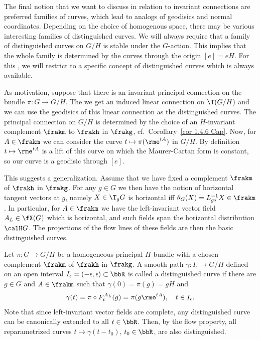The final notion that we want to discuss in relation to invariant connections are preferred families of curves, which lead to analogs of geodisics and normal coordinates. Depending on the choice of homogenous space, there may be various interesting families of distinguished curves. We will always require that a family of distinguished curves on $G\slash H$ is stable under the $G$-action. This implies that the whole family is determined by the curves through the origin $[e]=eH$. For this \subsect, we will restrict to a specific concept of distinguished curves which is always available.

As motivation, suppose that there is an invariant principal connection on the bundle $\pi:G\to G\slash H$. The we get an induced linear connection on $\T(G\slash H)$ and we can use the geodisics of this linear connection as the distinguished curves. The principal connection on $G\slash H$ is determined by the choice of an $H$-invariant complement $\frakm$ to $\frakh$ in $\frakg$, cf.\ Corollary~\ref{cor 1.4.6 Cap}. Now, for $A\in\frakm$ we can consider the curve $t\mapsto \pi(\rme^{tA})$ in $G\slash H$. By definition $t\mapsto \rme^{tA}$ is a lift of this curve on which the Maurer-Cartan form is constant, so our curve is a geodisic through $[e]$.

This suggests a generalization. Assume that we have fixed a complement $\frakm$ of $\frakh$ in $\frakg$. For any $g\in G$ we then have the notion of horizontal tangent vectors at $g$, namely $X\in \T_g G$ is horizontal iff $\theta_G(X)=L_{g\ast}^{-1}X\in\frakm$. In particular, for $A\in\frakm$ we have the left-invariant vector field $A_L\in\fX(G)$ which is horizontal, and such fields span the horizontal distribution $\calH G$. The projections of the flow lines of these fields are then the basic distinguished curves.

\begin{defn}
    Let $\pi:G\to G\slash H$ be a homogeneous principal $H$-bundle with a chosen complement $\frakm$ of $\frakh$ in $\frakg$. A smooth path $\gamma:I_\epsilon\to G\slash H$ defined on an open interval $I_\epsilon=(-\epsilon,\epsilon)\subset \bbR$ is called a distinguished curve if there are $g\in G$ and $A\in\frakm$ such that $\gamma(0)=\pi(g)=gH$ and 
    \[\gamma(t)=\pi\circ F^{A_L}_t(g)=\pi(g\rme^{tA}),\quad t\in I_\epsilon.\]
    Note that since left-invariant vector fields are complete, any distinguished curve can be canonically extended to all $t\in \bbR$. Then, by the flow property, all reparametrized curves $t\mapsto \gamma(t-t_0)$, $t_0\in\bbR$, are also distinguished.
\end{defn}



